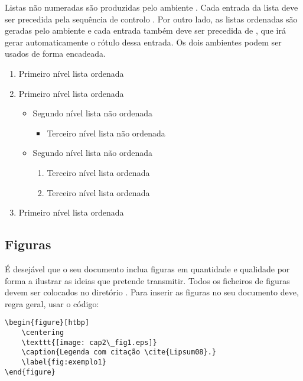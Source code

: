 Listas não numeradas são produzidas pelo ambiente . Cada entrada da lista deve ser precedida pela sequência de controlo . Por outro lado, as listas ordenadas são geradas pelo ambiente  e cada entrada também deve ser precedida de , que irá gerar automaticamente o rótulo dessa entrada. Os dois ambientes podem ser usados de forma encadeada.

\clearpage
\begin{enumerate}
   \item Primeiro nível lista ordenada
   \item Primeiro nível lista ordenada
   \begin{itemize}
     \item Segundo nível lista não ordenada
     \begin{itemize}
       \item Terceiro nível lista não ordenada
     \end{itemize}      
     \item Segundo nível lista não ordenada
     \begin{enumerate}
       \item Terceiro nível lista ordenada
       \item Terceiro nível lista ordenada
     \end{enumerate}    
   \end{itemize}
   \item Primeiro nível lista ordenada   
\end{enumerate} 


\subsection{Figuras}

É desejável que o seu documento inclua figuras em quantidade e qualidade por forma a ilustrar as ideias que pretende transmitir. Todos os ficheiros de figuras devem ser colocados no diretório . Para inserir as figuras no seu documento deve, regra geral, usar o código:

\begin{verbatim}
\begin{figure}[htbp]
	\centering
	\texttt{[image: cap2\_fig1.eps]}
	\caption{Legenda com citação \cite{Lipsum08}.}
	\label{fig:exemplo1}
\end{figure}
\end{verbatim}

